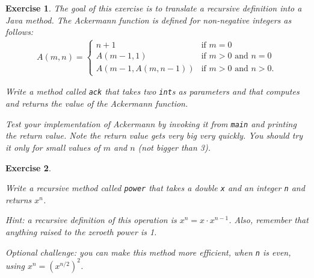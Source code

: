 \documentclass[12pt]{book}
\theoremstyle{exercise}
\newtheorem{exercise}{Exercise}[chapter]
\newcommand{\java}[1]{\verb"#1"}
\newcommand{\java}[1]{\lstinline{#1}} %
\begin{document}
\begin{exercise}

The goal of this exercise is to translate a recursive definition into a Java method.
The Ackermann function is defined for non-negative integers as follows:
\begin{eqnarray*}
A(m, n) = \begin{cases}
              n+1 & \mbox{if } m = 0 \\
        A(m-1, 1) & \mbox{if } m > 0 \mbox{ and } n = 0 \\
A(m-1, A(m, n-1)) & \mbox{if } m > 0 \mbox{ and } n > 0.
\end{cases}
\end{eqnarray*}

Write a method called \java{ack} that takes two \java{int}s as parameters and that computes and returns the value of the Ackermann function.

Test your implementation of Ackermann by invoking it from \java{main} and printing the return value.
Note the return value gets very big very quickly.
You should try it only for small values of $m$ and $n$ (not bigger than 3).

\end{exercise}


\begin{exercise}
\label{ex.power}

Write a recursive method called \java{power} that takes a double \java{x} and an integer \java{n} and returns $x^n$.

Hint: a recursive definition of this operation is $x^n = x \cdot x^{n-1}$.
Also, remember that anything raised to the zeroeth power is 1.

Optional challenge: you can make this method more efficient, when \java{n} is even, using $x^n = \left( x^{n/2} \right)^2$.

\end{exercise}
\end{document}
